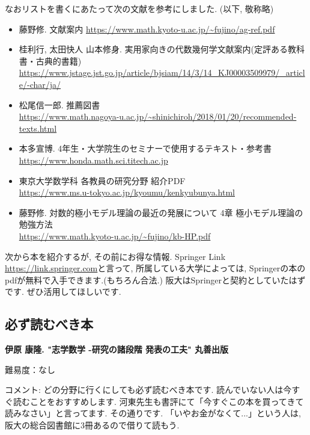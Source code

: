 なおリストを書くにあたって次の文献を参考にしました. (以下, 敬称略)
\vspace{-8pt}
\begin{itemize}[left=0pt]
  \setlength{\parskip}{0cm} %
  \setlength{\itemsep}{4pt} %
\item 藤野修. 文献案内 \url{https://www.math.kyoto-u.ac.jp/~fujino/ag-ref.pdf}
\item 桂利行, 太田快人 山本修身. 実用家向きの代数幾何学文献案内(定評ある教科書・古典的書籍) \url{https://www.jstage.jst.go.jp/article/bjsiam/14/3/14_KJ00003509979/_article/-char/ja/}
\item 松尾信一郎. 推薦図書 \\ \url{https://www.math.nagoya-u.ac.jp/~shinichiroh/2018/01/20/recommended-texts.html}
\item 本多宣博. 4年生・大学院生のセミナーで使用するテキスト・参考書 \\ \url{https://www.honda.math.sci.titech.ac.jp}
\item 東京大学数学科 各教員の研究分野 紹介PDF \\ \url{https://www.ms.u-tokyo.ac.jp/kyoumu/kenkyubunya.html}
\item 藤野修. 対数的極小モデル理論の最近の発展について 4章 極小モデル理論の勉強方法  \\ \url{https://www.math.kyoto-u.ac.jp/~fujino/kb-HP.pdf}
\end{itemize}


次から本を紹介するが, その前にお得な情報. 
Springer Link \url{https://link.springer.com}と言って, 所属している大学によっては, Springerの本のpdfが無料で入手できます.(もちろん合法.) 阪大はSpringerと契約としていたはずです. ぜひ活用してほしいです. 

\subsection{必ず読むべき本}

\textbf{伊原 康隆. "志学数学 -研究の諸段階 発表の工夫" 丸善出版} \vspace{-6pt}

難易度：なし \vspace{-6pt}

コメント: どの分野に行くにしても必ず読むべき本です. 読んでいない人は今すぐ読むことをおすすめします. 
河東先生も書評にて「今すぐこの本を買ってきて読みなさい」と言ってます. その通りです. 
「いやお金がなくて...」という人は, 阪大の総合図書館に3冊あるので借りて読もう. 

